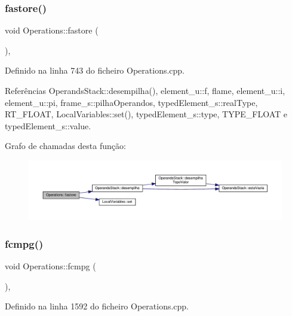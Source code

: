 \subsubsection{\texorpdfstring{fastore()}{fastore()}}
{\footnotesize\ttfamily void Operations\+::fastore (\begin{DoxyParamCaption}{ }\end{DoxyParamCaption})\hspace{0.3cm}{\ttfamily [static]}, {\ttfamily [private]}}



Definido na linha 743 do ficheiro Operations.\+cpp.



Referências Operands\+Stack\+::desempilha(), element\+\_\+u\+::f, flame, element\+\_\+u\+::i, element\+\_\+u\+::pi, frame\+\_\+s\+::pilha\+Operandos, typed\+Element\+\_\+s\+::real\+Type, R\+T\+\_\+\+F\+L\+O\+AT, Local\+Variables\+::set(), typed\+Element\+\_\+s\+::type, T\+Y\+P\+E\+\_\+\+F\+L\+O\+AT e typed\+Element\+\_\+s\+::value.

Grafo de chamadas desta função\+:
\nopagebreak
\begin{figure}[H]
\begin{center}
\leavevmode
\includegraphics[width=350pt]{classOperations_aa8a2c3048379b9d5cdc2b4611ef86190_cgraph}
\end{center}
\end{figure}
\mbox{\label{classOperations_a7825305c331404b97ef209a6e6d988ab}} 
\subsubsection{\texorpdfstring{fcmpg()}{fcmpg()}}
{\footnotesize\ttfamily void Operations\+::fcmpg (\begin{DoxyParamCaption}{ }\end{DoxyParamCaption})\hspace{0.3cm}{\ttfamily [static]}, {\ttfamily [private]}}



Definido na linha 1592 do ficheiro Operations.\+cpp.



